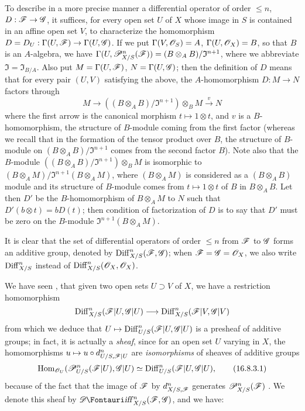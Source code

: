 \begin{env}[16.8.2]
\label{IV.16.8.2}
To describe in a more precise manner a differential operator of order $\leq n$, $D: \sh{F} \to \sh{G}$, it suffices, for every open set $U$ of $X$ whose image in $S$ is contained in an affine open set $V$, to characterize the homomorphism $D = D_U: \Gamma(U, \sh{F}) \to \Gamma(U, \sh{G})$.
If we put $\Gamma(V, \mathscr{O}_S) = A$, $\Gamma(U, \mathscr{O}_X) = B$, so that $B$ is an $A$-algebra, we have $\Gamma(U, \mathscr{P}_{X/S}^n(\mathscr{F}) ) = (B \otimes_A B)/\mathfrak{I}^{n+1}$, where we abbreviate $\mathfrak{I} = \mathfrak{I}_{B/A}$. 
Also put $M = \Gamma(U, \mathscr{F})$, $N = \Gamma(U, \mathscr{G})$;
then the definition of $D$ means that for every pair $(U,V)$ satisfying the above, the $A$-homomorphism $D:M \to N$ factors through
\[
  M \to ((B \otimes_A B)/\mathfrak{I}^{n+1}) \otimes_B M \xrightarrow{v} N
\]
where the first arrow is the canonical morphism $t \mapsto 1 \otimes t$, and $v$ is a $B$-homomorphism, the structure of $B$-module coming from the first factor (whereas we recall that in the formation of the tensor product over $B$, the structure of $B$-module on $(B \otimes_A B)/\mathfrak{I}^{n+1}$ comes from the second factor $B$).
Note also that the $B$-module $((B \otimes_A B)/\mathfrak{I}^{n+1}) \otimes_B M$ is isomorphic to $(B \otimes_A M)/\mathfrak{I}^{n+1}(B \otimes_A M)$, where $(B \otimes_A M)$ is considered as a $(B \otimes_A B)$ module and its structure of $B$-module comes from $t \mapsto 1 \otimes t$ of $B$ in $B \otimes_A B$.  
Let then $D'$ be the $B$-homomorphism of $B \otimes_A M$ to $N$ such that $D'(b \otimes t) = b D(t)$; then condition of factorization of $D$ is to say that $D'$ must be zero on the $B$-module $\mathfrak{I}^{n+1}(B \otimes_A M)$.
\end{env}

\begin{env}[16.8.3]
\label{IV.16.8.3}
It is clear that the set of differential operators of order $\leq n$ from $\mathscr{F}$ to $\mathscr{G}$ forms an additive group, denoted by $\operatorname{Diff}_{X/S}^n(\mathscr{F}, \mathscr{G})$;
when $\mathscr{F} = \mathscr{G} = \mathscr{O}_X$, we also write $\operatorname{Diff}_{X/S}^n$ instead of $\operatorname{Diff}_{X/S}^n(\mathscr{O}_X, \mathscr{O}_X)$.

We have seen , that given two open sets $U \supset V$ of $X$, we have a restriction homomorphism
\[
  \Diff_{X/S}^n(\sh{F}|U, \sh{G}|U) \to \Diff_{X/S}^n(\sh{F}|V, \sh{G}|V)
\]
from which we deduce that $U \mapsto \Diff_{U/S}^n(\sh{F}|U, \sh{G}|U)$ is a presheaf of additive groups;
in fact, it is actually a \emph{sheaf}, since for an open set $U$ varying in $X$, the homomorphisms $u \mapsto u \circ d_{U/S, \sh{F}|U}^n$ are \emph{isomorphisms} of sheaves of additive groups
\[
  \label{IV.16.8.3.1}
  \operatorname{Hom}_{\mathscr{O}_U}(\mathscr{P}_{U/S}^n(\mathscr{F}|U), \mathscr{G}|U) \simeq \operatorname{Diff}_{U/S}^n(\mathscr{F}|U, \mathscr{G}|U),
  \tag{16.8.3.1}
\]
because of the fact that the image of $\mathscr{F}$ by $d_{X/S, \mathscr{F}}^n$ generates $\mathscr{P}_{X/S}^n(\mathscr{F})$ .
We denote this sheaf by $\shDiff_{X/S}^n(\sh{F}, \sh{G})$, and we have:
\end{env}

